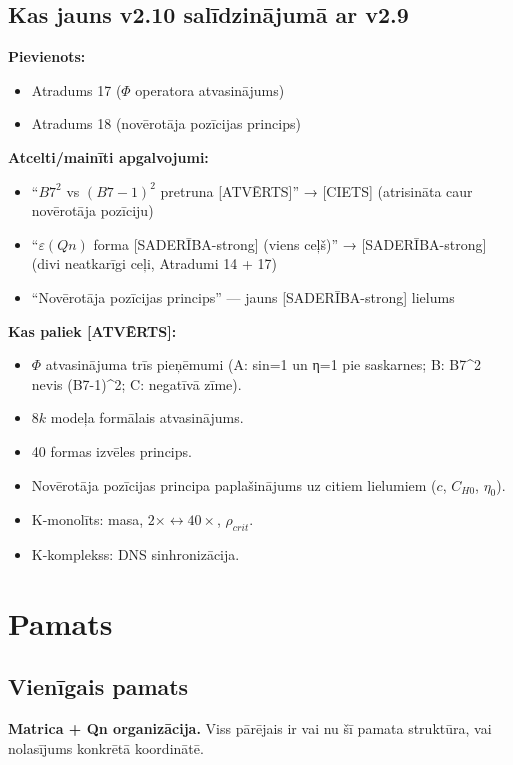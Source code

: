 \documentclass[12pt,a4paper]{article}
\begin{document}
\subsection*{Kas jauns v2.10 salīdzinājumā ar v2.9}

\textbf{Pievienots:}
\begin{itemize}
    \item Atradums 17 ($\Phi$ operatora atvasinājums)
    \item Atradums 18 (novērotāja pozīcijas princips)
\end{itemize}

\textbf{Atcelti/mainīti apgalvojumi:}
\begin{itemize}
    \item ``$B7^2$ vs $(B7-1)^2$ pretruna [ATVĒRTS]'' → [CIETS] (atrisināta caur novērotāja pozīciju)
    \item ``$\varepsilon(Qn)$ forma [SADERĪBA-strong] (viens ceļš)'' → [SADERĪBA-strong] (divi neatkarīgi ceļi, Atradumi 14 + 17)
    \item ``Novērotāja pozīcijas princips'' — jauns [SADERĪBA-strong] lielums
\end{itemize}

\textbf{Kas paliek [ATVĒRTS]:}
\begin{itemize}
    \item $\Phi$ atvasinājuma trīs pieņēmumi (A: sin=1 un η=1 pie saskarnes; B: B7^2 nevis (B7-1)^2; C: negatīvā zīme).
    \item $8k$ modeļa formālais atvasinājums.
    \item 40 formas izvēles princips.
    \item Novērotāja pozīcijas principa paplašinājums uz citiem lielumiem ($c$, $C_{H0}$, $\eta_0$).
    \item K-monolīts: masa, $2\times\leftrightarrow 40\times$, $\rho_{crit}$.
    \item K-komplekss: DNS sinhronizācija.
\end{itemize}

\newpage

\section{Pamats}
\label{sec:pamats}

\subsection*{Vienīgais pamats}

\textbf{Matrica + Qn organizācija.} Viss pārējais ir vai nu šī pamata struktūra, vai nolasījums konkrētā koordinātē.
\end{document}
